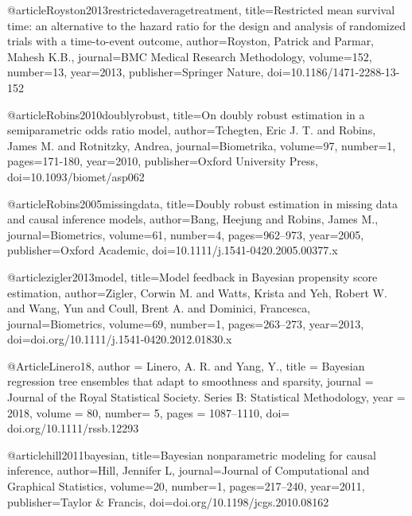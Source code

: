 @article{Royston2013restrictedaveragetreatment,
  title={Restricted mean survival time: an alternative to the hazard ratio for the design and analysis of randomized trials with a time-to-event outcome},
  author={Royston, Patrick and Parmar, Mahesh K.B.},
  journal={BMC Medical Research Methodology},
  volume={152},
  number={13},
  year={2013},
  publisher={Springer Nature},
  doi={10.1186/1471-2288-13-152}
}





@article{Robins2010doublyrobust,
  title={On doubly robust estimation in a semiparametric odds ratio model},
  author={Tchegten, Eric J. T. and Robins, James M. and Rotnitzky, Andrea},
  journal={Biometrika},
  volume={97},
  number={1},
  pages={171-180},
  year={2010},
  publisher={Oxford University Press},
  doi={10.1093/biomet/asp062}
}






@article{Robins2005missingdata,
  title={Doubly robust estimation in missing data and causal inference models},
  author={Bang, Heejung and Robins, James M.},
  journal={Biometrics},
  volume={61},
  number={4},
  pages={962--973},
  year={2005},
  publisher={Oxford Academic},
  doi={10.1111/j.1541-0420.2005.00377.x}
}





@article{zigler2013model,
  title={Model feedback in Bayesian propensity score estimation},
  author={Zigler, Corwin M. and Watts, Krista and Yeh, Robert W. and Wang, Yun and Coull, Brent A. and Dominici, Francesca},
  journal={Biometrics},
  volume={69},
  number={1},
  pages={263--273},
  year={2013},
  doi={doi.org/10.1111/j.1541-0420.2012.01830.x}
}











@Article{Linero18,
   author = {Linero, A. R. and Yang, Y.},
   title = {Bayesian regression tree ensembles that adapt to smoothness and sparsity},
   journal = {Journal of the Royal Statistical Society. Series B: Statistical Methodology},
   year = {2018},
   volume = {80},
   number= {5},
   pages = {1087--1110},
   doi= {doi.org/10.1111/rssb.12293}
 }






@article{hill2011bayesian,
  title={Bayesian nonparametric modeling for causal inference},
  author={Hill, Jennifer L},
  journal={Journal of Computational and Graphical Statistics},
  volume={20},
  number={1},
  pages={217--240},
  year={2011},
  publisher={Taylor \& Francis},
  doi={doi.org/10.1198/jcgs.2010.08162}
}






